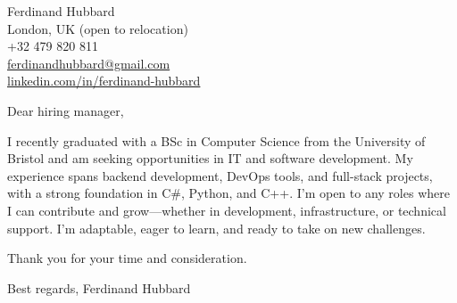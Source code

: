 \documentclass[11pt]{article}
\begin{document}
\noindent
Ferdinand Hubbard \\
London, UK (open to relocation) \\
+32 479 820 811 \\
\href{mailto:ferdinandhubbard@gmail.com}{ferdinandhubbard@gmail.com} \\
\href{https://www.linkedin.com/in/ferdinand-hubbard/}{linkedin.com/in/ferdinand-hubbard} \\
\vspace{1em}

Dear hiring manager,

I recently graduated with a BSc in Computer Science from the University of Bristol and am seeking opportunities in IT and software development. My experience spans backend development, DevOps tools, and full-stack projects, with a strong foundation in C\#, Python, and C++. I’m open to any roles where I can contribute and grow—whether in development, infrastructure, or technical support. I'm adaptable, eager to learn, and ready to take on new challenges.

Thank you for your time and consideration.

Best regards,
Ferdinand Hubbard
\end{document}
